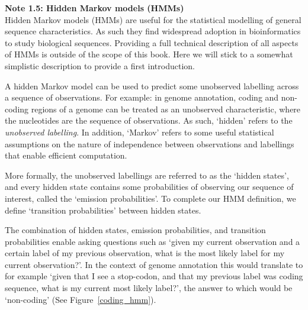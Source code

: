\begin{framed}
\textbf{Note 1.5: Hidden Markov models (HMMs)}\\
Hidden Markov models (HMMs) are useful for the statistical modelling of general sequence characteristics. As such they find widespread adoption in bioinformatics to study biological sequences. Providing a full technical description of all aspects of HMMs is outside of the scope of this book. Here we will stick to a somewhat simplistic description to provide a first introduction.

A hidden Markov model can be used to predict some unobserved labelling across a sequence of observations. For example: in genome annotation, coding and non-coding regions of a genome can be treated as an unobserved characteristic, where the nucleotides are the sequence of observations. As such, `hidden' refers to the \textit{unobserved labelling}. In addition, `Markov' refers to some useful statistical assumptions on the nature of independence between observations and labellings that enable efficient computation.

More formally, the unobserved labellings are referred to as the `hidden states', and every hidden state contains some probabilities of observing our sequence of interest, called the `emission probabilities'. To complete our HMM definition, we define `transition probabilities' between hidden states.

The combination of hidden states, emission probabilities, and transition probabilities enable asking questions such as `given my current observation and a certain label of my previous observation, what is the most likely label for my current observation?'. In the context of genome annotation this would translate to for example `given that I see a stop-codon, and that my previous label was coding sequence, what is my current most likely label?', the answer to which would be `non-coding' (See Figure~\ref{coding_hmm}).


\end{framed}
